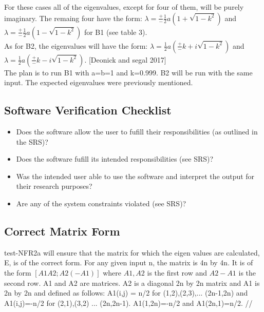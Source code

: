\documentclass[12pt, titlepage]{article}
\begin{document}
For these cases all of the eigenvalues, except for four of them, will be purely 
imaginary. The remaing four have the form: $\lambda = \frac{+}{-} \frac{1}{2} a 
(1+\sqrt{1-k^{2}})$ and $\lambda = \frac{+}{-} \frac{1}{2} a 
(1-\sqrt{1-k^{2}})$ for B1 (see table 3). \\ 
As for B2, the eigenvalues will have the form:  $\lambda =  \frac{1}{2} a 
(\frac{+}{-}k+ i \sqrt{1-k^{2}})$ and $\lambda = \frac{1}{2} a 
(\frac{+}{-}k - i \sqrt{1-k^{2}})$. [Deonick and segal 2017] \\ 
The plan is to run B1 with a=b=1 and k=0.999. B2 will be run with the same 
input. The expected eigenvalues were previously mentioned. 

\subsection{Software Verification Checklist} 
\label{softwarevercheck}
\begin{itemize}
	\item Does the software allow the user to fufill their responsibilities 
	(as outlined in the SRS)?
	\item Does the software fufill its intended responsibilities (see SRS)?
	\item Was the intended user able to use the software and interpret the 
	output for their research purposes?
	\item Are any of the system constraints violated (see SRS)?
\end{itemize}  


\newpage	
\subsection{Correct Matrix Form} 
\label{matrixform}
test-NFR2a will ensure that the matrix for which the eigen values are 
calculated, E, is of the correct form. For any given input n, the matrix is 4n 
by 4n. It is of the form $ [A1 A2; A2 (-A1)] $ where $ A1, A2$ is the first 
row 
and $A2 -A1$ is the second row. A1 and A2 are matrices. A2 is a diagonal 2n by 
2n matrix and A1 is 2n by 2n and defined as follows: A1(i,j) = n/2 for 
(1,2),(2,3),... (2n-1,2n) and A1(i,j)=-n/2 for (2,1),(3,2) ... (2n,2n-1). 
A1(1,2n)=-n/2 and A1(2n,1)=n/2. // 
\end{document}
